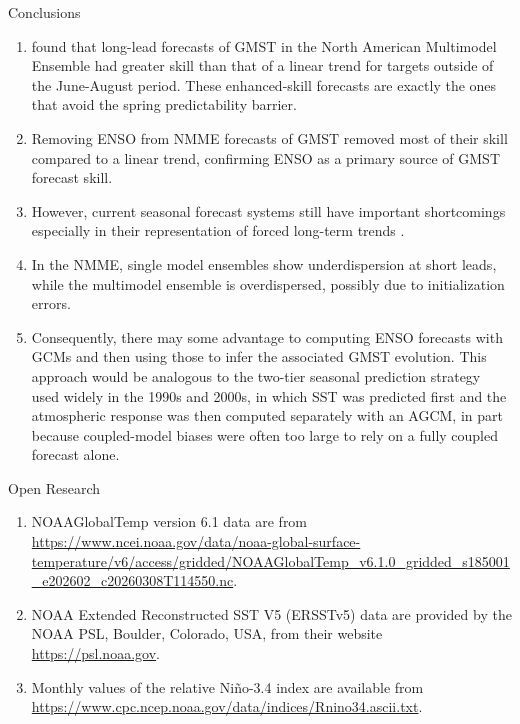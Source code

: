 \documentclass[aspectratio=169,xcolor=dvipsnames]{beamer}
\begin{document}
\begin{frame}[allowframebreaks]{Conclusions}
\begin{enumerate}
\item \citet{Tippett2024trends} found that long-lead forecasts of GMST
  in the North American Multimodel Ensemble
  \citep[NMME;][]{Becker2022decade,NMME_BAMS} had greater skill than
  that of a linear trend for targets outside of the June-August
  period. These enhanced-skill forecasts are exactly the ones that
  avoid the spring predictability barrier.

\item Removing ENSO from NMME forecasts of GMST removed most of their
  skill compared to a linear trend, confirming ENSO as a primary source of
  GMST forecast skill.

\item However, current seasonal forecast systems still have important
  shortcomings especially in their representation of forced long-term
  trends \citep{LHeureux2022-Trends1}.

\item In the NMME, single model ensembles show underdispersion at
  short leads, while the multimodel ensemble is overdispersed,
  possibly due to initialization errors.

\item Consequently, there may some advantage to computing ENSO
  forecasts with GCMs and then using those to infer the associated GMST
  evolution. This approach would be analogous to the two-tier seasonal
  prediction strategy used widely in the 1990s and 2000s, in which SST
  was predicted first and the atmospheric response was then computed
  separately with an AGCM, in part because coupled-model biases were
  often too large to rely on a fully coupled forecast alone.

\end{enumerate}
\end{frame}

%
%

\begin{frame}{Open Research}
  \begin{enumerate}
\item NOAAGlobalTemp version 6.1 data are from
  \url{https://www.ncei.noaa.gov/data/noaa-global-surface-temperature/v6/access/gridded/NOAAGlobalTemp_v6.1.0_gridded_s185001_e202602_c20260308T114550.nc}.
\item NOAA Extended Reconstructed SST V5 (ERSSTv5) data are provided
  by the NOAA PSL, Boulder, Colorado, USA, from their website
  \url{https://psl.noaa.gov}.
\item Monthly values of the relative Ni\~no-3.4 index are available
  from
  \url{https://www.cpc.ncep.noaa.gov/data/indices/Rnino34.ascii.txt}.
\end{enumerate}
\end{frame}
\end{document}
